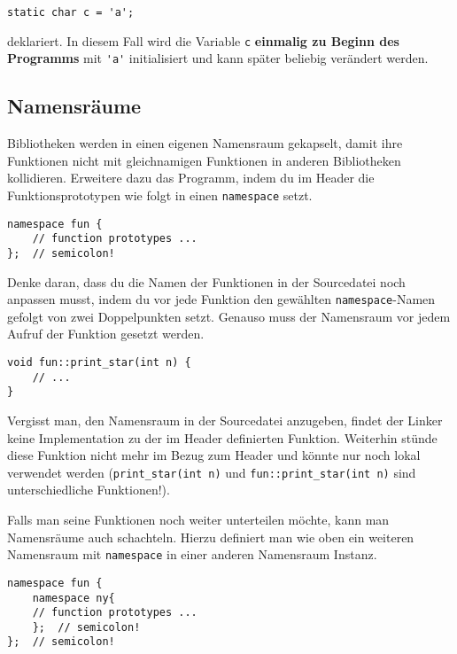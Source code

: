 \begin{lstlisting}
static char c = 'a';
\end{lstlisting}

deklariert.
In diesem Fall wird die Variable \lstinline{c} \textbf{einmalig zu Beginn des Programms} mit \lstinline{'a'} initialisiert und kann später beliebig verändert werden.


\subsection{Namensräume}
Bibliotheken werden in einen eigenen Namensraum gekapselt, damit ihre Funktionen nicht mit gleichnamigen Funktionen in anderen Bibliotheken kollidieren.
Erweitere dazu das Programm, indem du im Header die Funktionsprototypen wie
folgt in einen \lstinline{namespace} setzt.

\begin{lstlisting}
namespace fun {
	// function prototypes ...
};	// semicolon!
\end{lstlisting}

Denke daran, dass du die Namen der Funktionen in der Sourcedatei noch anpassen musst, indem du vor jede Funktion den gewählten \lstinline{namespace}-Namen gefolgt von zwei Doppelpunkten setzt.
Genauso muss der Namensraum vor jedem Aufruf der Funktion gesetzt werden.

\begin{lstlisting}
void fun::print_star(int n) {
	// ...
}
\end{lstlisting}

Vergisst man, den Namensraum in der Sourcedatei anzugeben, findet der Linker keine Implementation zu der im Header definierten Funktion.
Weiterhin stünde diese Funktion nicht mehr im Bezug zum Header und könnte nur noch lokal verwendet werden (\lstinline{print_star(int n)} und \lstinline{fun::print_star(int n)} sind unterschiedliche Funktionen!). \\ \smallskip

Falls man seine Funktionen noch weiter unterteilen möchte, kann man Namensräume auch schachteln.
Hierzu definiert man wie oben ein weiteren Namensraum mit \lstinline{namespace} in einer anderen Namensraum Instanz.

\begin{lstlisting}
namespace fun {
    namespace ny{
	// function prototypes ...
    };	// semicolon!
};	// semicolon!
\end{lstlisting}

